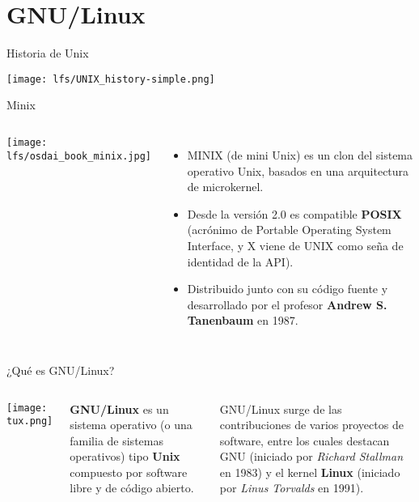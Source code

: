 
\section{GNU/Linux}

\begin{frame}[c]{Historia de Unix}
  \begin{center}
    \texttt{[image: lfs/UNIX\_history-simple.png]}
  \end{center}
\end{frame}

\begin{frame}[c]{Minix}
    \begin{columns}
        \begin{center}
            \texttt{[image: lfs/osdai\_book\_minix.jpg]}
        \end{center}
        \pausa
        \begin{itemize}
          \item MINIX (de mini Unix) es un clon del sistema operativo Unix,
            basados en una arquitectura de microkernel. 
          \pausa
          \item Desde la versión 2.0 es compatible \textbf{POSIX} (acrónimo
            de Portable Operating System Interface, y X viene de UNIX como
            seña de identidad de la API).
          \pausa
          \item Distribuido junto con su código fuente y desarrollado por el
            profesor \textbf{Andrew S. Tanenbaum} en 1987.
        \end{itemize}
    \end{columns}
\end{frame}

\begin{frame}[c]{¿Qué es GNU/Linux?}
    \begin{columns}
        \begin{center}
            \texttt{[image: tux.png]}
        \end{center}
        \pausa
        \textbf{GNU/Linux} es un sistema operativo (o una familia de sistemas
        operativos) tipo \textbf{Unix} compuesto por software libre y de código
        abierto.

        GNU/Linux surge de las contribuciones de varios proyectos
        de software, entre los cuales destacan GNU (iniciado por \emph{Richard
        Stallman} en 1983) y el kernel \textbf{Linux} (iniciado
        por \emph{Linus Torvalds} en 1991).
    \end{columns}
\end{frame}

